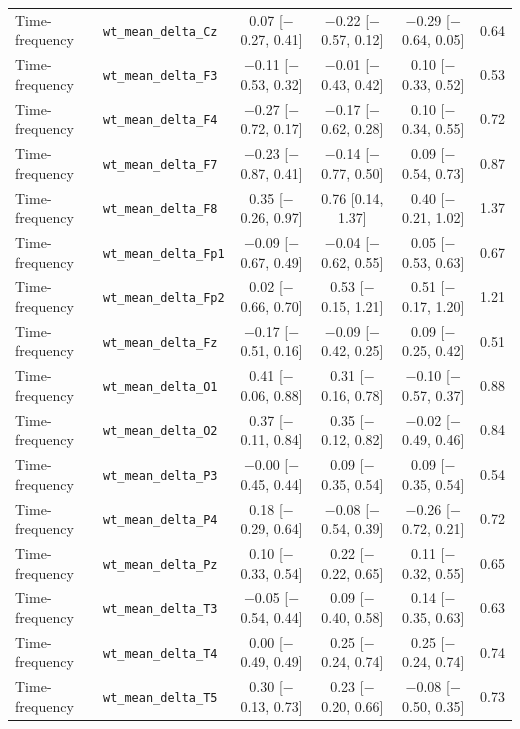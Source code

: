{\begin{longtable}{llcccc}
Time-frequency & \texttt{wt\_mean\_delta\_Cz} & 0.07 [$-$0.27, 0.41] & $-$0.22 [$-$0.57, 0.12] & $-$0.29 [$-$0.64, 0.05] & 0.64 \\
Time-frequency & \texttt{wt\_mean\_delta\_F3} & $-$0.11 [$-$0.53, 0.32] & $-$0.01 [$-$0.43, 0.42] & 0.10 [$-$0.33, 0.52] & 0.53 \\
Time-frequency & \texttt{wt\_mean\_delta\_F4} & $-$0.27 [$-$0.72, 0.17] & $-$0.17 [$-$0.62, 0.28] & 0.10 [$-$0.34, 0.55] & 0.72 \\
Time-frequency & \texttt{wt\_mean\_delta\_F7} & $-$0.23 [$-$0.87, 0.41] & $-$0.14 [$-$0.77, 0.50] & 0.09 [$-$0.54, 0.73] & 0.87 \\
Time-frequency & \texttt{wt\_mean\_delta\_F8} & 0.35 [$-$0.26, 0.97] & 0.76 [0.14, 1.37] & 0.40 [$-$0.21, 1.02] & 1.37 \\
Time-frequency & \texttt{wt\_mean\_delta\_Fp1} & $-$0.09 [$-$0.67, 0.49] & $-$0.04 [$-$0.62, 0.55] & 0.05 [$-$0.53, 0.63] & 0.67 \\
Time-frequency & \texttt{wt\_mean\_delta\_Fp2} & 0.02 [$-$0.66, 0.70] & 0.53 [$-$0.15, 1.21] & 0.51 [$-$0.17, 1.20] & 1.21 \\
Time-frequency & \texttt{wt\_mean\_delta\_Fz} & $-$0.17 [$-$0.51, 0.16] & $-$0.09 [$-$0.42, 0.25] & 0.09 [$-$0.25, 0.42] & 0.51 \\
Time-frequency & \texttt{wt\_mean\_delta\_O1} & 0.41 [$-$0.06, 0.88] & 0.31 [$-$0.16, 0.78] & $-$0.10 [$-$0.57, 0.37] & 0.88 \\
Time-frequency & \texttt{wt\_mean\_delta\_O2} & 0.37 [$-$0.11, 0.84] & 0.35 [$-$0.12, 0.82] & $-$0.02 [$-$0.49, 0.46] & 0.84 \\
Time-frequency & \texttt{wt\_mean\_delta\_P3} & $-$0.00 [$-$0.45, 0.44] & 0.09 [$-$0.35, 0.54] & 0.09 [$-$0.35, 0.54] & 0.54 \\
Time-frequency & \texttt{wt\_mean\_delta\_P4} & 0.18 [$-$0.29, 0.64] & $-$0.08 [$-$0.54, 0.39] & $-$0.26 [$-$0.72, 0.21] & 0.72 \\
Time-frequency & \texttt{wt\_mean\_delta\_Pz} & 0.10 [$-$0.33, 0.54] & 0.22 [$-$0.22, 0.65] & 0.11 [$-$0.32, 0.55] & 0.65 \\
Time-frequency & \texttt{wt\_mean\_delta\_T3} & $-$0.05 [$-$0.54, 0.44] & 0.09 [$-$0.40, 0.58] & 0.14 [$-$0.35, 0.63] & 0.63 \\
Time-frequency & \texttt{wt\_mean\_delta\_T4} & 0.00 [$-$0.49, 0.49] & 0.25 [$-$0.24, 0.74] & 0.25 [$-$0.24, 0.74] & 0.74 \\
Time-frequency & \texttt{wt\_mean\_delta\_T5} & 0.30 [$-$0.13, 0.73] & 0.23 [$-$0.20, 0.66] & $-$0.08 [$-$0.50, 0.35] & 0.73 \\

\end{longtable}}

